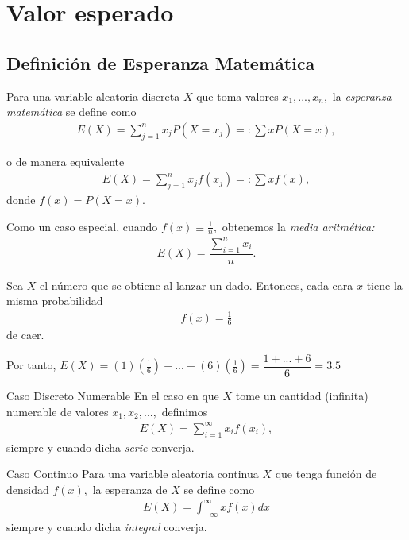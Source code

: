 \section{Valor esperado}

\subsection{Definición de Esperanza Matemática}


  Para una variable aleatoria discreta $X$ que toma valores $x_{1},...,x_{n},$ la \emph{esperanza matemática} se define como
  \begin{align}
   \label{eq:2.9.1}
   E(X)=\sum _{j=1}^{n} x_{j}P(X=x_{j})=:\sum xP(X=x),
  \end{align}

o de manera equivalente
  \begin{align}
   \label{eq:2.9.2}
   E(X)=\sum _{j=1}^{n} x_{j}f(x_{j})=:\sum xf(x),
  \end{align}
  donde $f(x)=P(X=x).$



 Como un caso especial, cuando $f(x)\equiv \frac{1}{n},$ obtenemos la \emph{media aritmética:}
 \begin{align}
  \label{eq:2.9.3}
  E(X)=\dfrac{\sum_{i=1}^{n}x_{i}}{n}.
 \end{align}


{}
\begin{ejemplo}
 Sea $X$ el número que se obtiene al lanzar un dado.  Entonces, cada cara $x$ tiene la misma probabilidad
 \begin{align}
 f(x) = \frac{1}{6}
\end{align} de caer.


Por tanto,
$E(X)= (1)\left( \frac{1}{6} \right)+...+(6)\left( \frac{1}{6} \right) = \dfrac{1+...+6}{6} = 3.5$
\end{ejemplo}



{Caso Discreto Numerable}
 En el caso en que $X$ tome un cantidad (infinita) numerable de valores $x_{1},x_{2},...,$ definimos
 \begin{align}
  E(X)=\sum_{i=1}^{\infty}x_{i}f(x_{i}),
 \end{align}
siempre y cuando dicha \emph{serie} converja.


%
%
% 

{Caso Continuo}
 Para una variable aleatoria continua $X$ que tenga función de densidad $f(x),$ la esperanza de $X$ se define como
 \begin{align}
  \label{eq:2.9.4}
  E(X)=\int_{-\infty}^{\infty}xf(x)dx
 \end{align}
siempre y cuando dicha \emph{integral} converja.


